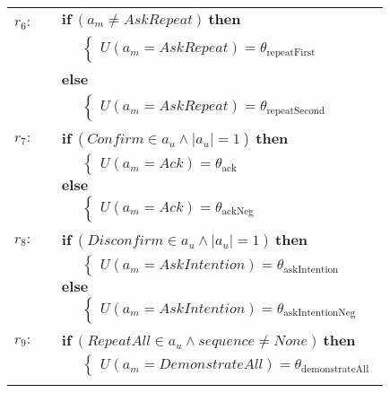 \begin{small}
\begin{longtable}{p{3cm}l}
$r_{6}: $\ \ & $\textbf{if} \ (\mathit{a_m}\!\neq\!\mathit{AskRepeat}) \ \textbf{then}$ \\
& $\;\;\;\;\; \begin{cases}U(\mathit{a_m}\!=\!\mathit{AskRepeat})\!=\!\theta_{\mathrm{repeatFirst}}\end{cases}$ \\ & \textbf{else} \\
& $\;\;\;\;\; \begin{cases}U(\mathit{a_m}\!=\!\mathit{AskRepeat})\!=\!\theta_{\mathrm{repeatSecond}}\end{cases}$ \\[3mm] \hdashline \\[-2mm]
$r_{7}: \ \ $& $\textbf{if} \ (\mathit{Confirm}\!\in\!\mathit{a_u} \land \mathit{|a_u|}\!=\!\mathit{1}) \ \textbf{then}$ \\
& $\;\;\;\;\; \begin{cases}U(\mathit{a_m}\!=\!\mathit{Ack})\!=\!\theta_{\mathrm{ack}}\end{cases}$ \\ 
& $\textbf{else}$ \\
& $\;\;\;\;\; \begin{cases}U(\mathit{a_m}\!=\!\mathit{Ack})\!=\!\theta_{\mathrm{ackNeg}}\end{cases}$ \\[3mm] \hdashline \\[-2mm]
$r_{8}: \ \ $& $\textbf{if} \ (\mathit{Disconfirm}\!\in\!\mathit{a_u} \land \mathit{|a_u|}\!=\!\mathit{1}) \ \textbf{then}$ \\
& $\;\;\;\;\; \begin{cases}U(\mathit{a_m}\!=\!\mathit{AskIntention})\!=\!\theta_{\mathrm{askIntention}}\end{cases}$ \\ 
& $\textbf{else}$ \\
& $\;\;\;\;\; \begin{cases}U(\mathit{a_m}\!=\!\mathit{AskIntention})\!=\!\theta_{\mathrm{askIntentionNeg}}\end{cases}$\\[3mm] \hdashline \\[-2mm]
$r_{9}: \ \ $& $\textbf{if} \ (\mathit{RepeatAll}\!\in\!\mathit{a_u} \land \mathit{sequence}\!\neq\!\mathit{None}) \ \textbf{then}$ \\
& $\;\;\;\;\; \begin{cases}U(\mathit{a_m}\!=\!\mathit{DemonstrateAll})\!=\!\theta_{\mathrm{demonstrateAll}}\end{cases}$\\[3mm] \hdashline \\[-2mm]

\end{longtable}
\end{small}
